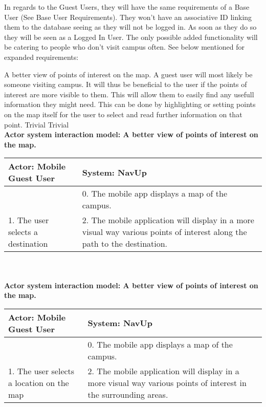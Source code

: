 In regards to the Guest Users, they will have the same requirements of a Base User (See Base User Requirements). They won't have an associative ID linking them to the database seeing as they will not be logged in. As soon as they do so they will be seen as a Logged In User. The only possible added functionality will be catering to people who don't visit campus often. See below mentioned for expanded requirements:

\FuncReq
{A better view of points of interest on the map.}
{A guest user will most likely be someone visiting campus. It will thus be beneficial to the user if the points of interest are more visible to them. This will allow them to easily find any usefull information they might need. This can be done by highlighting or setting points on the map itself for the user to select and read further information on that point.}
{Trivial}
{Trivial}
\\
\textbf{Actor system interaction model: A better view of points of interest on the map.}\\
\begin{tabular}{ | p{6cm} | p{6cm} |}
\hline
Actor: Mobile Guest User & System: NavUp \\ \hline
& 0. The mobile app displays a map of the campus.\\ \hline
1. The user selects a destination & 2. The mobile application will display in a more visual way various points of interest along the path to the destination.\\ \hline
\end{tabular}
\\
\bigskip
\\    
\textbf{Actor system interaction model: A better view of points of interest on the map. }\\
\begin{tabular}{ | p{6cm} | p{6cm} |}
\hline
Actor: Mobile Guest User & System: NavUp \\ \hline
& 0. The mobile app displays a map of the campus.\\ \hline
1. The user selects a location on the map & 2. The mobile application will display in a more visual way various points of interest in the surrounding areas.\\ \hline
\end{tabular}
\\
\bigskip

